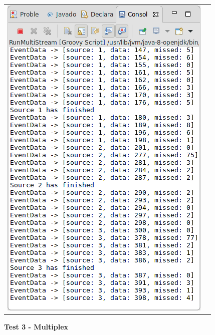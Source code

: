\begin{tabular}{c|c}
	\includegraphics[width=\textwidth/2]{img/screenshots/9-3-2-2.png} \\

\end{tabular}

\textbf{Test 3 - Multiplex}


